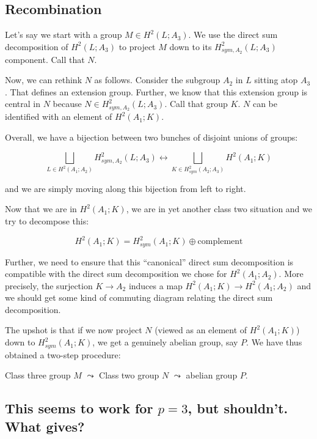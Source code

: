 \documentclass[10pt]{amsart}
\begin{document}
\subsection{Recombination}

Let's say we start with a group $M \in H^2(L;A_3)$. We use the direct
sum decomposition of $H^2(L;A_3)$ to project $M$ down to its
$H^2_{sym,A_2}(L;A_3)$ component. Call that $N$.

Now, we can rethink $N$ as follows. Consider the subgroup $A_2$ in $L$
sitting atop $A_3$. That defines an extension group. Further, we know
that this extension group is central in $N$ because $N \in
H^2_{sym,A_2}(L;A_3)$. Call that group $K$. $N$ can be identified with
an element of $H^2(A_1;K)$.

Overall, we have a bijection between two bunches of disjoint unions of
groups:

$$\bigsqcup_{L \in H^2(A_1;A_2)} H^2_{sym,A_2}(L;A_3) \leftrightarrow \bigsqcup_{K \in H^2_{sym}(A_2;A_3)} H^2(A_1;K)$$

and we are simply moving along this bijection from left to right.

Now that we are in $H^2(A_1;K)$, we are in yet another class two situation and we try to decompose this:

$$H^2(A_1;K) = H^2_{sym}(A_1;K) \oplus \text{complement}$$

Further, we need to ensure that this ``canonical'' direct sum
decomposition is compatible with the direct sum decomposition we chose
for $H^2(A_1;A_2)$. More precisely, the surjection $K \to A_2$ induces
a map $H^2(A_1;K) \to H^2(A_1;A_2)$ and we should get some kind of
commuting diagram relating the direct sum decomposition.

The upshot is that if we now project $N$ (viewed as an element of
$H^2(A_1;K)$) down to $H^2_{sym}(A_1;K)$, we get a genuinely abelian
group, say $P$. We have thus obtained a two-step procedure:

Class three group $M$ $\leadsto$ Class two group $N$ $\leadsto$
abelian group $P$.

\subsection{This seems to work for $p=3$, but shouldn't. What gives?}
\end{document}
